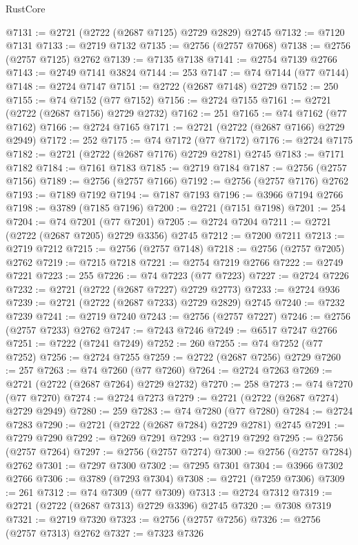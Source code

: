 \begin{lexlean}{RustCore}
\begin{coremodule}
@7131 := @2721 (@2722 (@2687 @7125) @2729 @2829) @2745
@7132 := @7120 @7131
@7133 := @2719 @7132
@7135 := @2756 (@2757 @7068)
@7138 := @2756 (@2757 @7125) @2762
@7139 := @7135 @7138
@7141 := @2754 @7139 @2766
@7143 := @2749 @7141 @3824
@7144 := 253
@7147 := @74 @7144 (@77 @7144)
@7148 := @2724 @7147
@7151 := @2722 (@2687 @7148) @2729
@7152 := 250
@7155 := @74 @7152 (@77 @7152)
@7156 := @2724 @7155
@7161 := @2721 (@2722 (@2687 @7156) @2729 @2732)
@7162 := 251
@7165 := @74 @7162 (@77 @7162)
@7166 := @2724 @7165
@7171 := @2721 (@2722 (@2687 @7166) @2729 @2949)
@7172 := 252
@7175 := @74 @7172 (@77 @7172)
@7176 := @2724 @7175
@7182 := @2721 (@2722 (@2687 @7176) @2729 @2781) @2745
@7183 := @7171 @7182
@7184 := @7161 @7183
@7185 := @2719 @7184
@7187 := @2756 (@2757 @7156)
@7189 := @2756 (@2757 @7166)
@7192 := @2756 (@2757 @7176) @2762
@7193 := @7189 @7192
@7194 := @7187 @7193
@7196 := @3966 @7194 @2766
@7198 := @3789 (@7185 @7196)
@7200 := @2721 (@7151 @7198)
@7201 := 254
@7204 := @74 @7201 (@77 @7201)
@7205 := @2724 @7204
@7211 := @2721 (@2722 (@2687 @7205) @2729 @3356) @2745
@7212 := @7200 @7211
@7213 := @2719 @7212
@7215 := @2756 (@2757 @7148)
@7218 := @2756 (@2757 @7205) @2762
@7219 := @7215 @7218
@7221 := @2754 @7219 @2766
@7222 := @2749 @7221
@7223 := 255
@7226 := @74 @7223 (@77 @7223)
@7227 := @2724 @7226
@7232 := @2721 (@2722 (@2687 @7227) @2729 @2773)
@7233 := @2724 @936
@7239 := @2721 (@2722 (@2687 @7233) @2729 @2829) @2745
@7240 := @7232 @7239
@7241 := @2719 @7240
@7243 := @2756 (@2757 @7227)
@7246 := @2756 (@2757 @7233) @2762
@7247 := @7243 @7246
@7249 := @6517 @7247 @2766
@7251 := @7222 (@7241 @7249)
@7252 := 260
@7255 := @74 @7252 (@77 @7252)
@7256 := @2724 @7255
@7259 := @2722 (@2687 @7256) @2729
@7260 := 257
@7263 := @74 @7260 (@77 @7260)
@7264 := @2724 @7263
@7269 := @2721 (@2722 (@2687 @7264) @2729 @2732)
@7270 := 258
@7273 := @74 @7270 (@77 @7270)
@7274 := @2724 @7273
@7279 := @2721 (@2722 (@2687 @7274) @2729 @2949)
@7280 := 259
@7283 := @74 @7280 (@77 @7280)
@7284 := @2724 @7283
@7290 := @2721 (@2722 (@2687 @7284) @2729 @2781) @2745
@7291 := @7279 @7290
@7292 := @7269 @7291
@7293 := @2719 @7292
@7295 := @2756 (@2757 @7264)
@7297 := @2756 (@2757 @7274)
@7300 := @2756 (@2757 @7284) @2762
@7301 := @7297 @7300
@7302 := @7295 @7301
@7304 := @3966 @7302 @2766
@7306 := @3789 (@7293 @7304)
@7308 := @2721 (@7259 @7306)
@7309 := 261
@7312 := @74 @7309 (@77 @7309)
@7313 := @2724 @7312
@7319 := @2721 (@2722 (@2687 @7313) @2729 @3396) @2745
@7320 := @7308 @7319
@7321 := @2719 @7320
@7323 := @2756 (@2757 @7256)
@7326 := @2756 (@2757 @7313) @2762
@7327 := @7323 @7326

\end{coremodule}
\end{lexlean}
